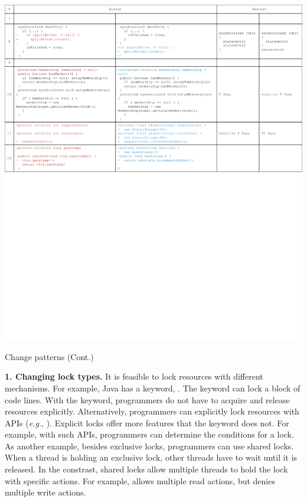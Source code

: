 \begin{table}
	\centering
	\includegraphics[width=1\textwidth]{patterns2}
	\caption{Change patterns (Cont.)}
	\label{table:patterns2}
\end{table}
\noindent
\textbf{1. Changing lock types.} It is feasible to lock resources with different mechanisms. For example, Java has a keyword, . The keyword can lock a block of code lines. With the keyword, programmers do not have to acquire and release resources explicitly. Alternatively, programmers can explicitly lock resources with APIs (\emph{e.g.}, ). Explicit locks offer more features that the  keyword does not. For example, with such APIs, programmers can determine the conditions for a lock. As another example, besides exclusive locks, programmers can use shared locks. When a thread is holding an exclusive lock, other threads have to wait until it is released. In the constrast, shared locks allow multiple threads to hold the lock with specific actions. For example,  allows multiple read actions, but denies multiple write actions.%

